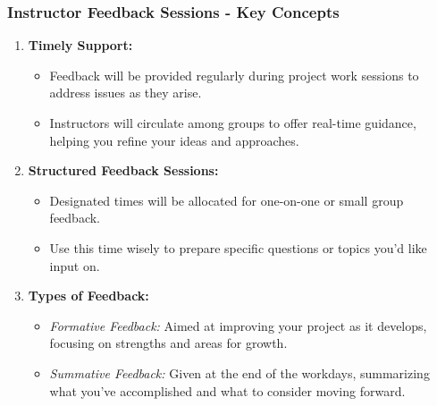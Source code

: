 \documentclass[aspectratio=169]{beamer}
\begin{document}
\begin{frame}[fragile]
    \frametitle{Instructor Feedback Sessions - Key Concepts}
    \begin{enumerate}
        \item \textbf{Timely Support:}
        \begin{itemize}
            \item Feedback will be provided regularly during project work sessions to address issues as they arise.
            \item Instructors will circulate among groups to offer real-time guidance, helping you refine your ideas and approaches.
        \end{itemize}
        
        \item \textbf{Structured Feedback Sessions:}
        \begin{itemize}
            \item Designated times will be allocated for one-on-one or small group feedback.
            \item Use this time wisely to prepare specific questions or topics you’d like input on.
        \end{itemize}

        \item \textbf{Types of Feedback:}
        \begin{itemize}
            \item \textit{Formative Feedback:} Aimed at improving your project as it develops, focusing on strengths and areas for growth.
            \item \textit{Summative Feedback:} Given at the end of the workdays, summarizing what you’ve accomplished and what to consider moving forward.
        \end{itemize}
    \end{enumerate}
\end{frame}
\end{document}
